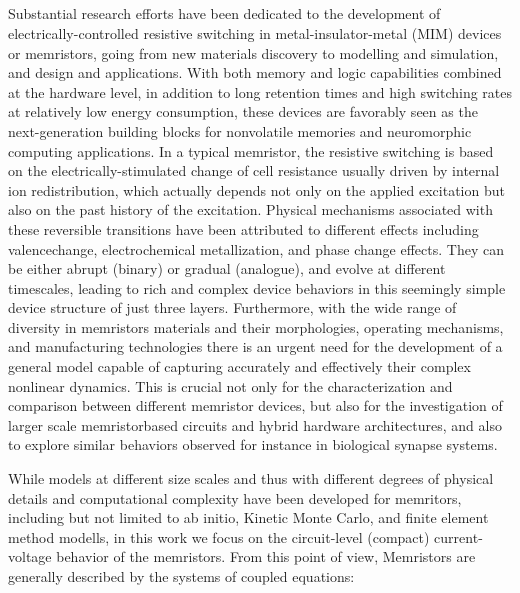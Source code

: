 \documentclass[10pt]{article}
\begin{document}
\begin{multicols}{2}
{\centering %
\section{}}
Substantial research efforts have been dedicated to the development of electrically-controlled resistive switching in metal-insulator-metal (MIM) devices or memristors, going from new materials discovery to modelling and simulation, and design and applications. With both memory and logic capabilities combined at the hardware level, in addition to long retention times and high switching rates at relatively low energy consumption, these devices are favorably seen as the next-generation building blocks for nonvolatile memories and neuromorphic computing applications. In a typical memristor, the resistive switching is based on the electrically-stimulated change of cell resistance usually driven by internal ion redistribution, which actually depends not only on the applied excitation but also on the past history of the excitation. Physical mechanisms associated with these reversible transitions have been attributed to different effects including valencechange, electrochemical metallization, and phase change effects. They can be either abrupt (binary) or gradual (analogue), and evolve at different timescales, leading to rich and complex device behaviors in this seemingly simple device structure of just three layers. Furthermore, with the wide range of diversity in memristors materials and their morphologies, operating mechanisms, and manufacturing technologies there is an urgent need for the development of a general model capable of capturing accurately and effectively their complex nonlinear dynamics. This is crucial not only for the characterization and comparison between different memristor devices, but also for the investigation of larger scale memristorbased circuits and hybrid hardware architectures, and also to explore similar behaviors observed for instance in biological synapse systems.
\par
While models at different size scales and thus with different degrees of physical details and computational complexity have been developed for memritors, including but not limited to ab initio, Kinetic Monte Carlo, and finite element method modells, in this work we focus on the circuit-level (compact) current-voltage behavior of the memristors. From this point of view, Memristors are generally described by the systems of coupled equations: 

\end{multicols}
\end{document}
